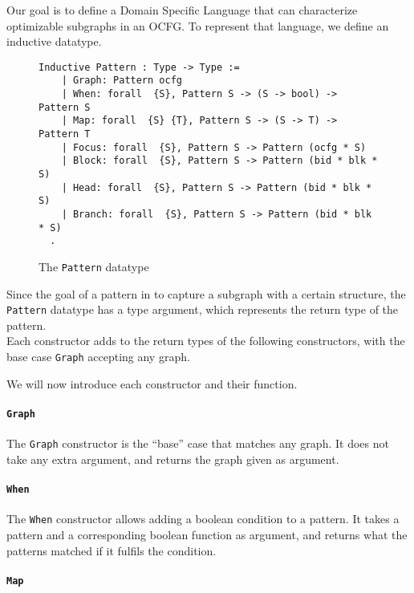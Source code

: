 \documentclass[11pt]{article}
\newcommand{\inlinecoq}[1]{\mbox{\lstinline[style=customcoq,columns=fixed,basewidth=.48em]{#1}}}
\newcommand{\ilc}[1]{\inlinecoq{#1}}
\begin{document}
Our goal is to define a Domain Specific Language that can characterize optimizable subgraphs in an OCFG\@. To represent that language, we define an inductive datatype.

\begin{figure}[h]
  \label{fig:pat}
  \begin{lstlisting}[style=customcoq,basicstyle=\small\ttfamily]
    Inductive Pattern : Type -> Type :=
    | Graph: Pattern ocfg
    | When: forall  {S}, Pattern S -> (S -> bool) -> Pattern S
    | Map: forall  {S} {T}, Pattern S -> (S -> T) -> Pattern T
    | Focus: forall  {S}, Pattern S -> Pattern (ocfg * S)
    | Block: forall  {S}, Pattern S -> Pattern (bid * blk * S)
    | Head: forall  {S}, Pattern S -> Pattern (bid * blk * S)
    | Branch: forall  {S}, Pattern S -> Pattern (bid * blk * S)
  .
  \end{lstlisting}
  \caption{The \ilc{Pattern} datatype}
\end{figure}

Since the goal of a pattern in to capture a subgraph with a certain structure, the \ilc{Pattern} datatype has a type argument, which represents the return type of the pattern.\\
Each constructor adds to the return types of the following constructors, with the base case \ilc{Graph} accepting any graph.

We will now introduce each constructor and their function.

\paragraph{\ilc{Graph}}

The \ilc{Graph} constructor is the ``base'' case that matches any graph. It does not take any extra argument, and returns the graph given as argument.

\paragraph{\ilc{When}}

The \ilc{When} constructor allows adding a boolean condition to a pattern.
It takes a pattern and a corresponding boolean function as argument, and returns what the patterns matched if it fulfils the condition.

\paragraph{\ilc{Map}}
\end{document}
